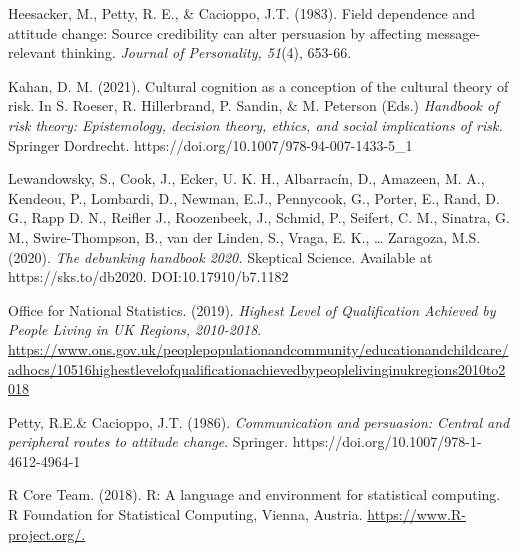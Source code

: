 \documentclass[authordate, empirical]{jote-new-article}
\begin{document}
	Heesacker, M., Petty, R. E., \& Cacioppo, J.T. (1983). Field dependence and attitude change: Source credibility can alter persuasion by affecting message-relevant thinking. \emph{Journal of Personality, 51}(4), 653-66.







	Kahan, D. M. (2021). Cultural cognition as a conception of the cultural theory of risk. In S. Roeser, R. Hillerbrand, P. Sandin, \& M. Peterson (Eds.) \emph{Handbook of risk theory: Epistemology, decision theory, ethics, and social implications of risk. }Springer Dordrecht. https://doi.org/10.1007/978-94-007-1433-5\_1











	Lewandowsky, S., Cook, J., Ecker, U. K. H., Albarracín, D., Amazeen, M. A., Kendeou, P., Lombardi, D., Newman, E.J., Pennycook, G., Porter, E., Rand, D. G., Rapp D. N., Reifler J., Roozenbeek, J., Schmid, P., Seifert, C. M., Sinatra, G. M., Swire-Thompson, B., van der Linden, S., Vraga, E. K., … Zaragoza, M.S. (2020). \emph{The debunking handbook 2020.} Skeptical Science. Available at https://sks.to/db2020. DOI:10.17910/b7.1182







	Office for National Statistics. (2019). \emph{Highest Level of Qualification Achieved by People Living in UK Regions, 2010-2018}. \href{https://www.ons.gov.uk/peoplepopulationandcommunity/educationandchildcare/adhocs/10516highestlevelofqualificationachievedbypeoplelivinginukregions2010to2018}{https://www.ons.gov.uk/peoplepopulationandcommunity/educationandchildcare/adhocs/10516highestlevelofqualificationachievedbypeoplelivinginukregions2010to2018}







	Petty, R.E.\& Cacioppo, J.T. (1986). \emph{Communication and persuasion: Central and peripheral routes to attitude change}. Springer. https://doi.org/10.1007/978-1-4612-4964-1







	R Core Team. (2018). R: A language and environment for statistical computing. R Foundation for Statistical Computing, Vienna, Austria. \href{https://www.R-project.org/}{https://www.R-project.org/.}
\end{document}
